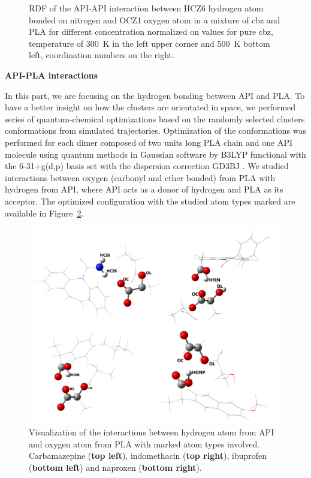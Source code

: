 \begin{figure}[htb]
	\vspace{-0.3cm}
	\caption{RDF of the API-API interaction between HCZ6 hydrogen atom bonded on nitrogen and OCZ1 oxygen atom in a mixture of cbz and PLA for different concentration normalized on values for pure cbz, temperature of 300~K in the left upper corner and 500~K bottom left, coordination numbers on the right.}
	\label{fig:cbz_RDF_}
\end{figure}

\newpage
\textbf{API-PLA interactions}

In this part, we are focusing on the hydrogen bonding between API and PLA. To have a better insight on how the clusters are orientated in space, we performed series of quantum-chemical optimizations based on the randomly selected clusters conformations from simulated trajectories. Optimization of the conformations was performed for each dimer composed of two units long PLA chain and one API molecule using quantum methods in Gaussian \cite{frisch_gaussian16_2016} software by B3LYP functional with the 6-31+g(d,p) basis set with the dispersion correction GD3BJ \cite{smith_revised_2016}. We studied interactions between oxygen (carbonyl and ether bonded) from PLA with hydrogen from API, where API acts as a donor of hydrogen and PLA as its acceptor. The optimized configuration with the studied atom types marked are available in Figure~\ref{fig:contact}.


\begin{figure}[htb!]
	\includegraphics[width=\linewidth]{img/all_pla_api_bp.png} 
	\vspace{-1cm}
	\caption{Visualization of the interactions between hydrogen atom from API and oxygen atom from PLA with marked atom types involved. Carbamazepine (\textbf{top left}), indomethacin (\textbf{top right}), ibuprofen (\textbf{bottom left}) and naproxen (\textbf{bottom right}).}
	\vspace{-0.3cm}
	\label{fig:contact}    
\end{figure}

